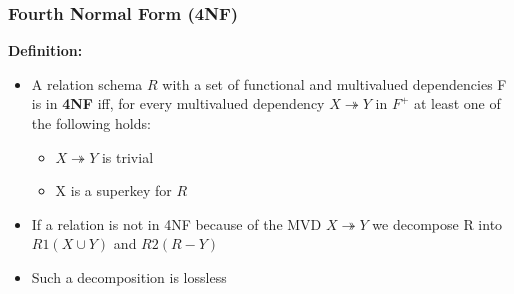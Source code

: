 \subsubsection{Fourth Normal Form (4NF)}

\textbf{Definition:}
\begin{itemize}[label=\(\rhd\)]
    \item A relation schema $R$ with a set of functional and multivalued dependencies F is in \textbf{4NF} iff, for every multivalued dependency $X \twoheadrightarrow Y$ in $F^+$ at least one of the following holds:
    \begin{itemize}[label=\(\rhd\)]
        \item $X\twoheadrightarrow Y$ is trivial
        \item X is a superkey for $R$
    \end{itemize}
    \item If a relation is not in 4NF because of the MVD $X \twoheadrightarrow Y$ we decompose R into $R1(X\cup Y)$ and $R2(R-Y)$
    \item Such a decomposition is lossless
\end{itemize}

